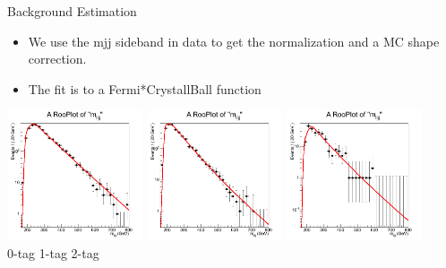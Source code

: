 \begin{frame}{Background Estimation}
  \scriptsize
  \begin{itemize}
  \item
    We use the mjj sideband in data to get the normalization and a MC shape correction.

\item
  The fit is to a Fermi*CrystallBall function
\end{itemize}

\begin{center}
    \includegraphics[width=0.3\textwidth]{images/fromDani/mZZ_sidebandsDATA_alpha_0btag_ALL_log.png}
    \includegraphics[width=0.3\textwidth]{images/fromDani/mZZ_sidebandsDATA_alpha_1btag_ALL_log.png}
    \includegraphics[width=0.3\textwidth]{images/fromDani/mZZ_sidebandsDATA_alpha_2btag_ALL_log.png}\\
0-tag \hspace{10.5em} 1-tag \hspace{10.5em} 2-tag
\end{center}

\end{frame}


